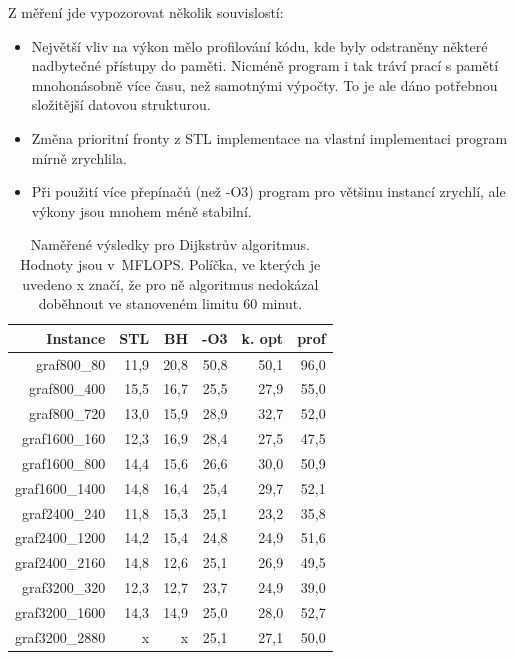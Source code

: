 \documentclass[a4paper,11pt]{article}
\begin{document}
Z měření jde vypozorovat několik souvislostí:
\begin{itemize}
 \item Největší vliv na výkon mělo profilování kódu, kde byly odstraněny některé nadbytečné přístupy do paměti. Nicméně program i tak tráví prací s pamětí mnohonásobně více času, než samotnými výpočty. To je ale dáno potřebnou složitější datovou strukturou.
 \item Změna prioritní fronty z STL implementace na vlastní implementaci program mírně zrychlila.
 \item Při použití více přepínačů (než -O3) program pro většinu instancí zrychlí, ale výkony jsou mnohem méně stabilní.
\end{itemize}
\begin{table}[H]
  \begin{center}
      \begin{tabular}{|r|r|r|r|r|r|}
      \hline
      Instance  	& STL	  & BH    & -O3	 & k. opt  & prof  \\ \hline
      graf800\_80  	& 11,9  & 20,8	  & 50,8 & 50,1    & 96,0  \\ \hline
      graf800\_400     	& 15,5  & 16,7 	  & 25,5 & 27,9	   & 55,0  \\ \hline
      graf800\_720  	& 13,0  & 15,9 	  & 28,9 & 32,7	   & 52,0  \\ \hline
      graf1600\_160    	& 12,3  & 16,9 	  & 28,4 & 27,5	   & 47,5  \\ \hline
      graf1600\_800  	& 14,4  & 15,6 	  & 26,6 & 30,0	   & 50,9  \\ \hline
      graf1600\_1400   	& 14,8  & 16,4 	  & 25,4 & 29,7	   & 52,1  \\ \hline
      graf2400\_240  	& 11,8  & 15,3	  & 25,1 & 23,2    & 35,8  \\ \hline
      graf2400\_1200   	& 14,2  & 15,4	  & 24,8 & 24,9    & 51,6  \\ \hline
      graf2400\_2160  	& 14,8  & 12,6	  & 25,1 & 26,9    & 49,5  \\ \hline
      graf3200\_320    	& 12,3  & 12,7	  & 23,7 & 24,9    & 39,0  \\ \hline
      graf3200\_1600  	& 14,3  & 14,9	  & 25,0 & 28,0    & 52,7  \\ \hline
      graf3200\_2880   	& x    	& x 	  & 25,1 & 27,1    & 50,0  \\ \hline
      \end{tabular}
  \caption{Naměřené výsledky pro Dijkstrův algoritmus. Hodnoty jsou v~MFLOPS. Políčka, ve kterých je uvedeno x značí, že pro ně algoritmus nedokázal doběhnout ve stanoveném limitu 60 minut.}
  \label{tab:dijkstra1}
  \end{center}
\end{table}
\end{document}
